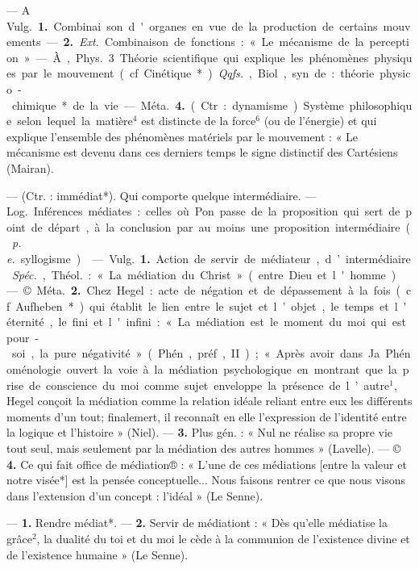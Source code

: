 \begin{itemize}[leftmargin=1cm, label=, itemsep=1pt]
 — A \si{Vulg.} {\bf 1.} Combinai
son d'organes en vue de la production de certains mouvements. —
 {\bf 2.} {\it Ext.} Combinaison de fonctions :
« Le mécanisme de la perception ».

— À, \si{Phys.} 3 Théorie scientifique qui explique les phénomènes
physiques par le mouvement (cf.
Cinétique*). {\it Qqfs.}, Biol, syn. de :
théorie physico-chimique* de la vie.
— \si{Méta.} {\bf 4.} (Ctr. : dynamisme).
Système philosophique selon lequel
la matière$^4$ est distincte de la force$^6$
(ou de l'énergie) et qui explique
l’ensemble des phénomènes matériels par le mouvement : « Le mécanisme est devenu dans ces derniers
temps le signe distinctif des Cartésiens (Mairan).

 — (Ctr. : immédiat*). Qui
comporte quelque intermédiaire. —
\si{Log.} Inférences médiates : celles où
Pon passe de la proposition qui sert
de point de départ, à la conclusion
par au moins une proposition intermédiaire ({\it p. e.} syllogisme).

 — \si{Vulg.} {\bf 1.} Action de
servir de médiateur, d’intermédiaire.
{\it Spéc.}, \si{Théol.} : « La médiation du
Christ » (entre Dieu et l'homme).

— ©. \si{Méta.} {\bf 2.} Chez Hegel : acte
de négation et de dépassement à la
fois (cf. Aufheben*) qui établit le
lien entre le sujet et l’objet, le temps
et l'éternité, le fini et l'infini : « La
médiation est le moment du moi qui
est pour-soi, la pure négativité »
(Phén., préf., II) ; « Après avoir dans
Ja Phénoménologie ouvert la voie à
la médiation psychologique en montrant que la prise de conscience du
moi comme sujet enveloppe la présence de l’autre$^1$, Hegel conçoit la
médiation comme la relation idéale
reliant entre eux les différents moments d’un tout; finalemert, il
reconnaît en elle l'expression de
l'identité entre la logique et l’histoire » (Niel). — {\bf 3.} Plus gén. : « Nul
ne réalise sa propre vie tout seul,
mais seulement par la médiation des
autres hommes » (Lavelle). —
© {\bf 4.} Ce qui fait office de médiation® :
« L’une de ces médiations [entre la
valeur et notre visée*] est la pensée
conceptuelle... Nous faisons rentrer
ce que nous visons dans l’extension
d’un concept : l’idéal » (Le Senne).

 — {\bf 1.} Rendre médiat*. —
 {\bf 2.} Servir de médiationt : « Dès
qu'elle médiatise la grâce$^2$, la dualité du toi et du moi le cède à la
communion de l'existence divine et
de l’existence humaine » (Le Senne).


\end{itemize}
